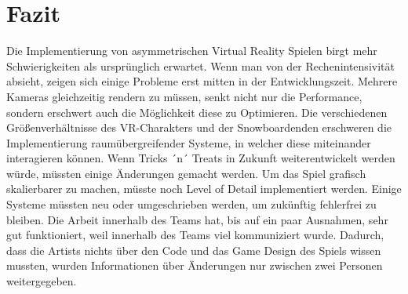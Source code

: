 \chapter{Fazit}
Die Implementierung von asymmetrischen Virtual Reality Spielen birgt mehr Schwierigkeiten als ursprünglich erwartet. Wenn man von der Rechenintensivität absieht, zeigen sich einige Probleme erst mitten in der Entwicklungszeit. Mehrere Kameras gleichzeitig rendern zu müssen, senkt nicht nur die Performance, sondern erschwert auch die Möglichkeit diese zu Optimieren. Die verschiedenen Größenverhältnisse des VR-Charakters und der Snowboardenden erschweren die Implementierung raumübergreifender Systeme, in welcher diese miteinander interagieren können. Wenn Tricks ´n´ Treats in Zukunft weiterentwickelt werden würde, müssten einige Änderungen gemacht werden. Um das Spiel grafisch skalierbarer zu machen, müsste noch Level of Detail implementiert werden. Einige Systeme müssten neu oder umgeschrieben werden, um zukünftig fehlerfrei zu bleiben. Die Arbeit innerhalb des Teams hat, bis auf ein paar Ausnahmen, sehr gut funktioniert, weil innerhalb des Teams viel kommuniziert wurde. Dadurch, dass die Artists nichts über den Code und das Game Design des Spiels wissen mussten, wurden Informationen über Änderungen nur zwischen zwei Personen weitergegeben.
